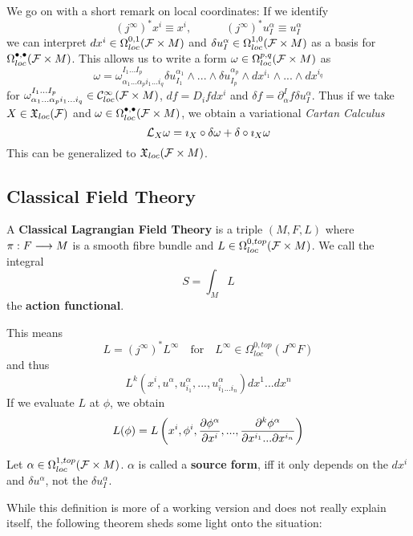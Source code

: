 We go on with a short remark on local coordinates: If we identify
$$ (j^\infty)^* x^i \equiv x^i, \quad \quad \quad (j^\infty)^* u^\alpha_I \equiv u^\alpha_I $$
we can interpret $dx^i \in \Omega^{0,1}_{loc}({\mathcal{F}}\times M)$ and $\delta u^\alpha_I \in \Omega^{1,0}_{loc}({\mathcal{F}}\times M)$ as a basis for $\Omega^{\bullet, \bullet}_{loc}({\mathcal{F}}\times M)$. This allows us to write a form $\omega \in \Omega^{p,q}_{loc}({\mathcal{F}}\times M)$ as
$$ \omega = \omega^{I_1 ... I_p}_{\alpha_1 ... \alpha_p i_1 ... i_q} \delta u^{\alpha_1}_{I_1}\wedge ... \wedge \delta u^{\alpha_p}_{I_p} \wedge dx^{i_1} \wedge ... \wedge dx^{i_q}  $$
for $\omega^{I_1 ... I_p}_{\alpha_1 ... \alpha_p i_1 ... i_q} \in \mathcal{C}^{\infty}_{loc}({\mathcal{F}}\times M)$, $df = D_i f dx^i$ and $\delta f = \partial^I_\alpha f \delta u^\alpha_I$. Thus if we take $X\in \mathfrak{X}_{loc}({\mathcal{F}})$ and $\omega \in \Omega^{\bullet,\bullet}_{loc}({\mathcal{F}}\times M)$, we obtain a variational \emph{Cartan Calculus}
$$ \mathcal{L}_{X} \omega = \imath_X \circ \delta \omega + \delta \circ \imath_X \omega $$
This can be generalized to $\mathfrak{X}_{loc}({\mathcal{F}}\times M)$.


\newpage
\subsection{Classical Field Theory}

\begin{definition}
   A \textbf{Classical Lagrangian Field Theory} is a triple $(M, F, L)$ where $\pi:F\longrightarrow M$ is a smooth fibre bundle and $L \in \Omega^{0, top}_{loc}({\mathcal{F}} \times M)$. We call the integral
   $$ S = \int_M L $$
   the \textbf{action functional}.
\end{definition}

This means
$$ L = (j^\infty)^* L^\infty \quad \text{for} \quad L^\infty \in \Omega^{0, top}_{loc}(J^\infty F) $$
and thus
$$ L^k \left(x^i, u^\alpha, u^\alpha_{i_1}, ..., u^\alpha_{i_1 ...i_n} \right) dx^1 ... dx^n$$
If we evaluate $L$ at $\phi$, we obtain
$$ L(\phi) = L\left(x^i, \phi^i, \dell{\phi^\alpha}{x^i}, ..., \dell{^k \phi^\alpha}{x^{i_1} ... \partial x^{i_n}}\right) $$

\begin{definition}
  Let $\alpha \in \Omega^{1,top}_{loc}({\mathcal{F}} \times M)$. $\alpha$ is called a \textbf{source form}, iff it only depends on the $dx^i$ and $\delta u^\alpha$, not the $\delta u^\alpha_I$.
\end{definition}

While this definition is more of a working version and does not really explain itself, the following theorem sheds some light onto the situation:


